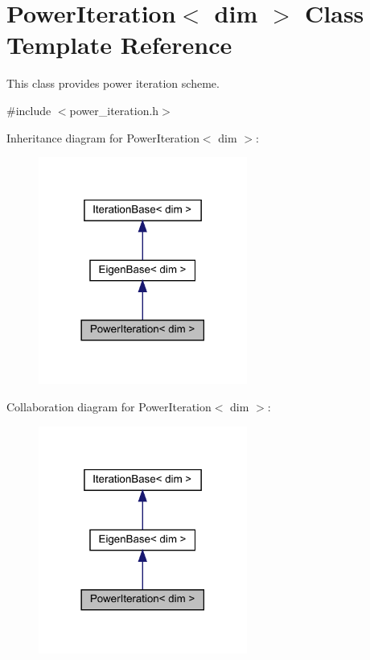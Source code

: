 \hypertarget{class_power_iteration}{}\section{Power\+Iteration$<$ dim $>$ Class Template Reference}
\label{class_power_iteration}


This class provides power iteration scheme.  




{\ttfamily \#include $<$power\+\_\+iteration.\+h$>$}



Inheritance diagram for Power\+Iteration$<$ dim $>$\+:\nopagebreak
\begin{figure}[H]
\begin{center}
\leavevmode
\includegraphics[width=194pt]{class_power_iteration__inherit__graph}
\end{center}
\end{figure}


Collaboration diagram for Power\+Iteration$<$ dim $>$\+:\nopagebreak
\begin{figure}[H]
\begin{center}
\leavevmode
\includegraphics[width=194pt]{class_power_iteration__coll__graph}
\end{center}
\end{figure}
